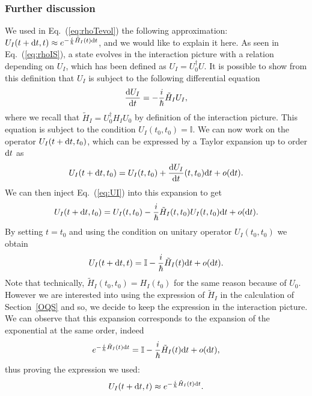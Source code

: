 \subsubsection{Further discussion}
We used in Eq.~(\ref{eq:rhoTevol}) the following approximation: $U_I(t+\mathrm{d}t,t)\approx e^{-\frac{i}{\hbar}\tilde{H}_I(t)\mathrm{d}t}$, and we would like to explain it here. 
As seen in Eq.~(\ref{eq:rhoIS}), a state evolves in the interaction picture with a relation depending on $U_I$, which has been defined as $U_I=U_0^\dagger U$. It is possible to show from this definition that $U_I$ is subject to the following differential equation
\begin{equation}\label{eq:UI}
    \frac{\mathrm{d}U_I}{\mathrm{d}t}=-\frac{i}{\hbar}\tilde{H}_I U_I,
\end{equation}
where we recall that $\tilde{H}_I=U_0^\dagger H_I U_0$ by definition of the interaction picture. This equation is subject to the condition $U_I(t_0,t_0)=\mathbb{I}$. We can now work on the operator $U_I(t+\mathrm{d}t,t_0)$, which can be expressed by a Taylor expansion up to order $\mathrm{d}t$ as
\begin{equation}
    U_I(t+\mathrm{d}t,t_0)=U_I(t,t_0)+\frac{\mathrm{d}U_I}{\mathrm{d}t}(t,t_0)\mathrm{d}t + o(\mathrm{d}t).
\end{equation}
We can then inject Eq.~(\ref{eq:UI}) into this expansion to get
\begin{equation}
    U_I(t+\mathrm{d}t,t_0)=U_I(t,t_0)-\frac{i}{\hbar}\tilde{H}_I(t,t_0)U_I(t,t_0)\mathrm{d}t + o(\mathrm{d}t).
\end{equation}
By setting $t=t_0$ and using the condition on unitary operator $U_I(t_0,t_0)$ we obtain
\begin{equation}
    U_I(t+\mathrm{d}t,t)=\mathbb{I}-\frac{i}{\hbar}\tilde{H}_I(t)\mathrm{d}t + o(\mathrm{d}t).
\end{equation}
Note that technically, $\tilde{H}_I(t_0,t_0)=H_I(t_0)$ for the same reason because of $U_0$. However we are interested into using the expression of $\tilde{H}_I$ in the calculation of Section~\ref{OQS} and so, we decide to keep the expression in the interaction picture. We can observe that this expansion corresponds to the expansion of the exponential at the same order, indeed
\begin{equation}
    e^{-\frac{i}{\hbar}\tilde{H}_I(t)\mathrm{d}t}=\mathbb{I}-\frac{i}{\hbar}\tilde{H}_I(t)\mathrm{d}t + o(\mathrm{d}t),
\end{equation}
thus proving the expression we used:
\begin{equation}
    U_I(t+\mathrm{d}t,t)\approx e^{-\frac{i}{\hbar}\tilde{H}_I(t)\mathrm{d}t}.
\end{equation}